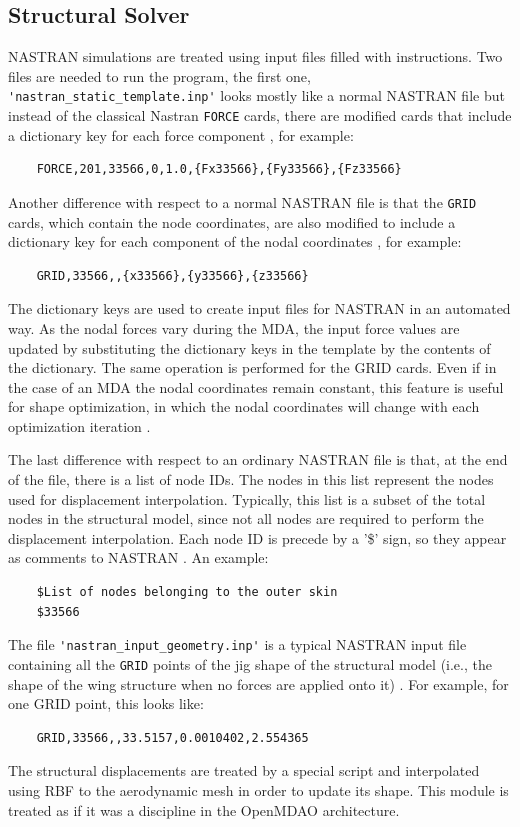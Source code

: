 \subsection{Structural Solver}
NASTRAN simulations are treated using input files filled with instructions. Two files are needed to run the program, the first one, \verb|'nastran_static_template.inp'| looks mostly like a normal NASTRAN file but instead of the classical Nastran \verb|FORCE| cards, there are modified cards that include a dictionary key for each force component \cite{mascolomer:tel-02023612}, for example:
\begin{verbatim}
    FORCE,201,33566,0,1.0,{Fx33566},{Fy33566},{Fz33566}
\end{verbatim}
Another difference with respect to a normal NASTRAN file is that the \verb|GRID| cards, which contain the node coordinates, are also modified to include a dictionary key for each component of the nodal coordinates \cite{mascolomer:tel-02023612}, for example:
\begin{verbatim}
    GRID,33566,,{x33566},{y33566},{z33566}
\end{verbatim}
The dictionary keys are used to create input files for NASTRAN in an automated way. As the nodal forces vary during the MDA, the input force values are updated by substituting the dictionary keys in the template by the contents of the dictionary. The same operation is performed for the GRID cards. Even if in the case of an MDA the nodal coordinates remain constant, this feature is useful for shape optimization, in which the nodal coordinates will change with each optimization iteration \cite{mascolomer:tel-02023612}. \par
The last difference with respect to an ordinary NASTRAN file is that, at the end of the file, there is a list of node IDs. The nodes in this list represent the nodes used for displacement interpolation. Typically, this list is a subset of the total nodes in the structural model, since not all nodes are required to perform the displacement interpolation. Each node ID is precede by a '\$' sign, so they appear as comments to NASTRAN \cite{mascolomer:tel-02023612}. An example:
\begin{verbatim}
    $List of nodes belonging to the outer skin
    $33566
\end{verbatim}
The file \verb|'nastran_input_geometry.inp'| is a typical NASTRAN input file containing all the \verb|GRID| points of the jig shape of the structural model (i.e., the shape of the wing structure when no forces are applied onto it) \cite{mascolomer:tel-02023612}. For example, for one GRID point, this looks like:
\begin{verbatim}
    GRID,33566,,33.5157,0.0010402,2.554365
\end{verbatim}
The structural displacements are treated by a special script and interpolated using RBF to the aerodynamic mesh in order to update its shape. This module is treated as if it was a discipline in the OpenMDAO architecture.  
